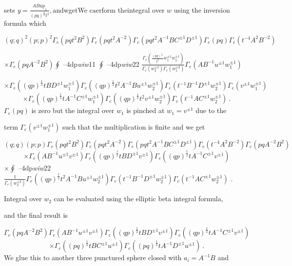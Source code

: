 \documentclass[a4paper,12pt]{article}
\begin{document}
sets {\it y}$=\displaystyle \frac{AB\mathrm{n}\underline{\mathrm{p}}_{1}}{(pq)^{\frac{1}{2}}t^{2}},\mathrm{a}\mathrm{n}\mathrm{d}\mathrm{w}$getWe c$\mathrm{a}\mathrm{e}$rform t$\mathrm{h}\mathrm{e}\mathrm{i}$ntegral over $w$ using the inversion formula which

$(q;q)^{2}(p;p)^{2}\Gamma_{e}(pqt^{2}B^{2})\Gamma_{e}(pqt^{2}A^{-2})\Gamma_{e}(pqt^{2}A^{-1}BC^{\pm 1}D^{\pm 1})\Gamma_{e}(pq)\Gamma_{e}(t^{-4}A^{2}B^{-2})$

$\displaystyle \times\Gamma_{e}(pqA^{-2}B^{2})\oint$ --4dp{\it wiw}11 $\displaystyle \oint$ --4dp{\it wiw}22 $\displaystyle \frac{\Gamma_{e}(\frac{(pq)^{\frac{1}{2}}}{t^{2}}w_{1}^{\pm 1}w_{2}^{\pm 1})}{\Gamma_{e}(w_{2}^{\pm 2})\Gamma_{e}(w_{1}^{\pm 2})}\Gamma_{e}(AB^{-1}u^{\pm 1}w_{1}^{\pm 1})$

$\times\Gamma_{e}((qp)^{\frac{1}{2}}tBD^{\pm 1}w_{1}^{\pm 1})\Gamma_{e}((qp)^{\frac{1}{2}}t^{2}A^{-1}Bu^{\pm 1}w_{2}^{\pm 1})\Gamma_{e}(t^{-1}B^{-1}D^{\pm 1}w_{2}^{\pm 1})\Gamma_{e}(v^{\pm 1}w_{1}^{\pm 1})$
$$
\times\Gamma_{e}((qp)^{\frac{1}{2}}tA^{-1}C^{\pm 1}w_{1}^{\pm 1})\Gamma_{e}((qp)^{\frac{1}{2}}t^{2}v^{\pm 1}w_{2}^{\pm 1})\Gamma_{e}(t^{-1}AC^{\pm 1}w_{2}^{\pm 1})\ .
$$
$\Gamma_{e}(pq)$ is zero but the integral over $w_{1}$ is pinched at $w_{1} = v^{\pm 1}$ due to the

term $\Gamma_{e}(v^{\pm 1}w_{1}^{\pm 1})$ such that the multiplication is finite and we get

$(q;q)(p;p)\Gamma_{e}(pqt^{2}B^{2})\Gamma_{e}(pqt^{2}A^{-2})\Gamma_{e}(pqt^{2}A^{-1}BC^{\pm 1}D^{\pm 1})\Gamma_{e}(t^{-4}A^{2}B^{-2})\Gamma_{e}(pqA^{-2}B^{2})$
$$
\times\Gamma_{e}(AB^{-1}u^{\pm 1}v^{\pm 1})\Gamma_{e}((qp)^{\frac{1}{2}}tBD^{\pm 1}v^{\pm 1})\Gamma_{e}((qp)^{\frac{1}{2}}tA^{-1}C^{\pm 1}v^{\pm 1})
$$
$\displaystyle \times\oint$ --4dp{\it wiw}22 $\displaystyle \frac{1}{\Gamma_{e}(w_{2}^{\pm 2})}\Gamma_{e}((qp)^{\frac{1}{2}}t^{2}A^{-1}Bu^{\pm 1}w_{2}^{\pm 1})\Gamma_{e}(t^{-1}B^{-1}D^{\pm 1}w_{2}^{\pm 1})\Gamma_{e}(t^{-1}AC^{\pm 1}w_{2}^{\pm 1})$ .

Integral over $w_{2}$ can be evaluated using the elliptic beta integral formula,

and the final result is

$\Gamma_{e}(pqA^{-2}B^{2})\Gamma_{e}(AB^{-1}u^{\pm 1}v^{\pm 1})\Gamma_{e}((qp)^{\frac{1}{2}}tBD^{\pm 1}v^{\pm 1})\Gamma_{e}((qp)^{\frac{1}{2}}tA^{-1}C^{\pm 1}v^{\pm 1})$
$$
\times\Gamma_{e}((pq)^{\frac{1}{2}}tBC^{\pm 1}u^{\pm 1})\Gamma_{e}((pq)^{\frac{1}{2}}tA^{-1}D^{\pm 1}u^{\pm 1})\ .
$$
We glue this to another three punctured sphere closed with $a_{i}=A^{-1}B$ and
\end{document}
